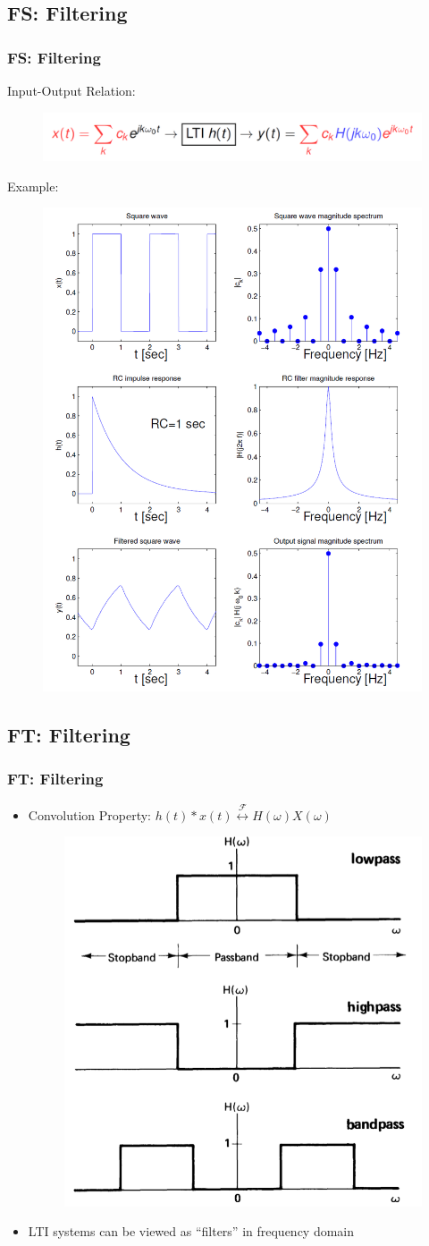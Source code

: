 \documentclass{beamer}
\begin{document}
\subsection{FS: Filtering}

\begin{frame}
    \frametitle{FS: Filtering}
Input-Output Relation:
\begin{figure}
    \includegraphics[width=0.6\linewidth]{input_output}
\end{figure}

Example:
\begin{figure}
    \includegraphics[width=0.35\linewidth]{filter_eg.PNG}
\end{figure}
\end{frame}


\subsection{FT: Filtering}
\begin{frame}
    \frametitle{FT: Filtering}
    \begin{itemize}
    \item Convolution Property: $h(t)* x(t) \stackrel{\mathscr{F}}{\longleftrightarrow} H(\omega) X(\omega)    $
    
    \begin{figure}
    \includegraphics[width=0.5\linewidth]{filter}
    \end{figure}
    \item LTI systems can be viewed as ``filters'' in frequency domain
    \end{itemize}
\end{frame}
\end{document}
